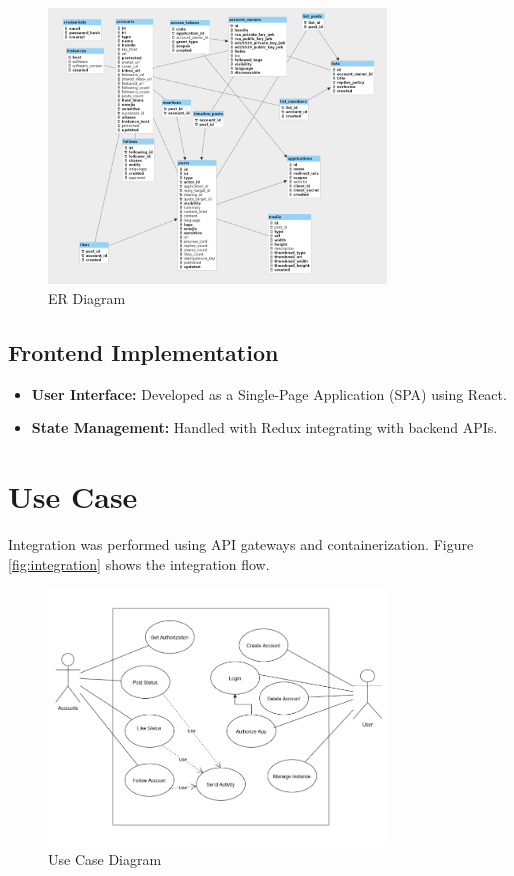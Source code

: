 \begin{figure}[h!]
    \centering
    \includegraphics[width=0.8\textwidth]{Graphics/erdiagram.png}
    \caption{ER Diagram}
\end{figure}

\subsection{Frontend Implementation}
\begin{itemize}
    \item \textbf{User Interface:} Developed as a Single-Page Application (SPA) using React.
    \item \textbf{State Management:} Handled with Redux integrating with backend APIs.
\end{itemize}

\section{Use Case}
Integration was performed using API gateways and containerization. Figure \ref{fig:integration} shows the integration flow.
\begin{figure}[h!]
    \centering
    \includegraphics[width=0.8\textwidth]{Graphics/usecasediagram.png}
    \caption{Use Case Diagram}
\end{figure}

